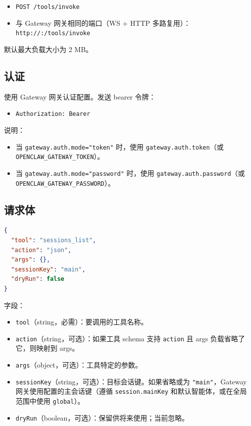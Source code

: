 \begin{itemize}
  \item \texttt{POST /tools/invoke}
  \item 与 Gateway 网关相同的端口（WS + HTTP 多路复用）：\texttt{http://:/tools/invoke}
\end{itemize}


默认最大负载大小为 2 MB。

\subsection{认证}


使用 Gateway 网关认证配置。发送 bearer 令牌：

\begin{itemize}
  \item \texttt{Authorization: Bearer }
\end{itemize}


说明：

\begin{itemize}
  \item 当 \texttt{gateway.auth.mode="token"} 时，使用 \texttt{gateway.auth.token}（或 \texttt{OPENCLAW\_GATEWAY\_TOKEN}）。
  \item 当 \texttt{gateway.auth.mode="password"} 时，使用 \texttt{gateway.auth.password}（或 \texttt{OPENCLAW\_GATEWAY\_PASSWORD}）。
\end{itemize}


\subsection{请求体}


\begin{lstlisting}[language=json]
{
  "tool": "sessions_list",
  "action": "json",
  "args": {},
  "sessionKey": "main",
  "dryRun": false
}
\end{lstlisting}


字段：

\begin{itemize}
  \item \texttt{tool}（string，必需）：要调用的工具名称。
  \item \texttt{action}（string，可选）：如果工具 schema 支持 \texttt{action} 且 args 负载省略了它，则映射到 args。
  \item \texttt{args}（object，可选）：工具特定的参数。
  \item \texttt{sessionKey}（string，可选）：目标会话键。如果省略或为 \texttt{"main"}，Gateway 网关使用配置的主会话键（遵循 \texttt{session.mainKey} 和默认智能体，或在全局范围中使用 \texttt{global}）。
  \item \texttt{dryRun}（boolean，可选）：保留供将来使用；当前忽略。
\end{itemize}


